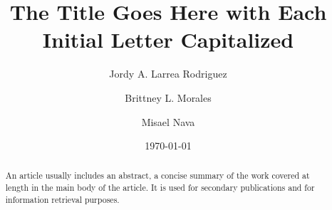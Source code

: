 \documentclass[%
 aip,
cp,  %
 amsmath,amssymb,%
 reprint,%
]{revtex4-2}
\begin{document}
\title{The Title Goes Here with Each Initial Letter Capitalized}%

\author{Jordy A. Larrea Rodriguez} %

\author{Brittney L. Morales}%

\author{Misael Nava}

\date{\today} %
\begin{abstract}
An article usually includes an abstract, a concise summary of the work
covered at length in the main body of the article. It is used for
secondary publications and for information retrieval purposes.
\end{abstract}

\maketitle

\nocite{*}
\end{document}
